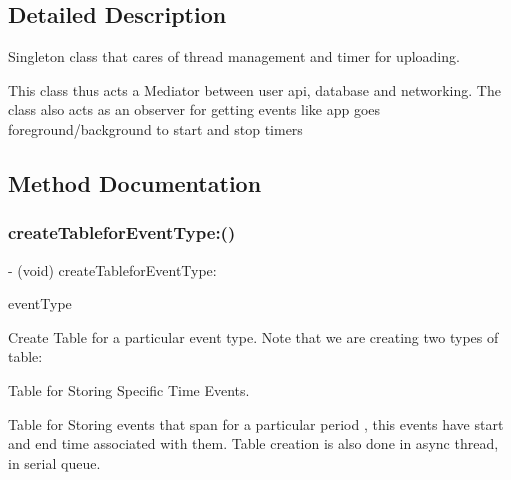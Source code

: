 \subsection{Detailed Description}
Singleton class that cares of thread management and timer for uploading. 

This class thus acts a Mediator between user api, database and networking. The class also acts as an observer for getting events like app goes foreground/background to start and stop timers 

\subsection{Method Documentation}
\mbox{\label{interface_n_f_l_o_g_request_manager_a2c7a9f7fd9fb53d6a94a585274a6bc4f}} 
\subsubsection{\texorpdfstring{create\+Tablefor\+Event\+Type\+:()}{createTableforEventType:()}}
{\footnotesize\ttfamily -\/ (void) create\+Tablefor\+Event\+Type\+: \begin{DoxyParamCaption}\item[{(N\+S\+String $\ast$)}]{event\+Type }\end{DoxyParamCaption}}



Create Table for a particular event type. Note that we are creating two types of table\+: 


\begin{DoxyEnumerate}
\item Table for Storing Specific Time Events.
\item Table for Storing events that span for a particular period , this events have start and end time associated with them. Table creation is also done in async thread, in serial queue. 
\end{DoxyEnumerate}\mbox{\label{interface_n_f_l_o_g_request_manager_aa134b2591aa16f5577724d26e53b3eb5}} 
